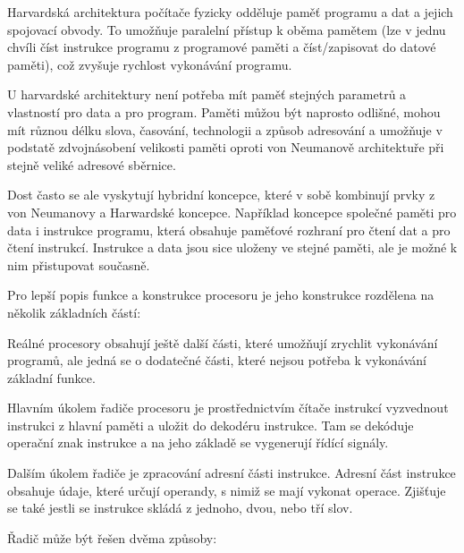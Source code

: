 Harvardská architektura počítače fyzicky odděluje paměť programu a dat a jejich spojovací obvody. To umožňuje paralelní přístup k oběma pamětem (lze v jednu chvíli číst instrukce programu z programové paměti a číst/zapisovat do datové paměti), což zvyšuje rychlost vykonávání programu.

U harvardské architektury není potřeba mít paměť stejných parametrů a vlastností pro data a pro program. Paměti můžou být naprosto odlišné, mohou mít různou délku slova, časování, technologii a způsob adresování a umožňuje v podstatě zdvojnásobení velikosti paměti oproti von Neumanově architektuře při stejně veliké adresové sběrnice.

\vskip 4mm
\centerline{}
\vskip 4mm

Dost často se ale vyskytují hybridní koncepce, které v sobě kombinují prvky z von Neumanovy a Harwardské koncepce. Například koncepce společné paměti pro data i instrukce programu, která obsahuje paměťové rozhraní pro čtení dat a pro čtení instrukcí. Instrukce a data jsou sice uloženy ve stejné paměti, ale je možné k nim přistupovat současně.


Pro lepší popis funkce a konstrukce procesoru je jeho konstrukce rozdělena na několik základních částí:

\vskip 4mm
\vskip 4mm

Reálné procesory obsahují ještě další části, které umožňují zrychlit vykonávání programů, ale jedná se o dodatečné části, které nejsou potřeba k vykonávání základní funkce.


Hlavním úkolem řadiče procesoru je prostřednictvím čítače instrukcí vyzvednout instrukci z hlavní paměti a uložit do dekodéru instrukce. Tam se dekóduje operační znak instrukce a na jeho základě se vygenerují řídící signály.

Dalším úkolem řadiče je zpracování adresní části instrukce. Adresní část instrukce obsahuje údaje, které určují operandy, s nimiž se mají vykonat operace. Zjišťuje se také jestli se instrukce skládá z jednoho, dvou, nebo tří slov.

Řadič může být řešen dvěma způsoby:

\vskip 4mm
\vskip 4mm

